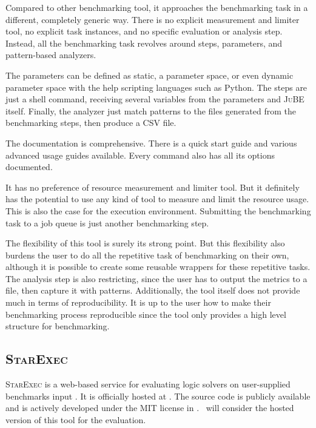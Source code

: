 Compared to other benchmarking tool, it approaches the benchmarking task in a different, completely generic way.
There is no explicit measurement and limiter tool, no explicit task instances, and no specific evaluation or analysis step.
Instead, all the benchmarking task revolves around steps, parameters, and pattern-based analyzers.

The parameters can be defined as static, a parameter space, or even dynamic parameter space with the help scripting languages such as Python.
The steps are just a shell command, receiving several variables from the parameters and \textsc{JuBE} itself.
Finally, the analyzer just match patterns to the files generated from the benchmarking steps, then produce a CSV file.

The documentation is comprehensive.
There is a quick start guide and various advanced usage guides available.
Every command also has all its options documented.

It has no preference of resource measurement and limiter tool.
But it definitely has the potential to use any kind of tool to measure and limit the resource usage.
This is also the case for the execution environment.
Submitting the benchmarking task to a job queue is just another benchmarking step.

The flexibility of this tool is surely its strong point.
But this flexibility also burdens the user to do all the repetitive task of benchmarking on their own, although it is possible to create some reusable wrappers for these repetitive tasks.
The analysis step is also restricting, since the user has to output the metrics to a file, then capture it with patterns.
Additionally, the tool itself does not provide much in terms of reproducibility.
It is up to the user how to make their benchmarking process reproducible since the tool only provides a high level structure for benchmarking.


\subsection{\textsc{StarExec}}

\textsc{StarExec} is a web-based service for evaluating logic solvers on user-supplied benchmarks input \citep{stumpStarExecCrossCommunityInfrastructure2014}.
It is officially hosted at \href{https://www.starexec.org/}{}.
The source code is publicly available and is actively developed under the MIT license in \citet{StarExecCrossCommunity2019}.
\First~will consider the hosted version of this tool for the evaluation.

